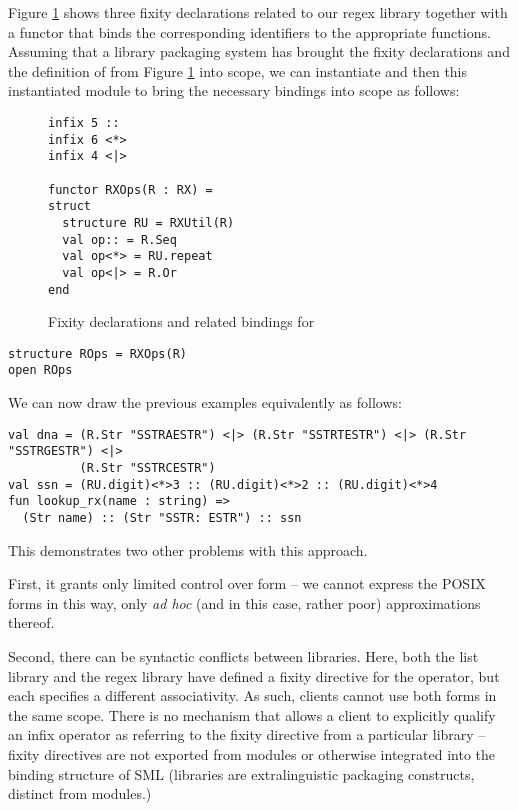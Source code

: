Figure \ref{fig:infix-RX} shows three fixity declarations related to our regex library together with a functor  that binds the corresponding identifiers to the appropriate functions. Assuming that a library packaging system has brought the fixity declarations and the definition of  from Figure \ref{fig:infix-RX} into scope, we can instantiate  and then  this instantiated module to bring the necessary bindings into scope as follows:


\begin{figure}
\begin{lstlisting}
infix 5 ::
infix 6 <*>
infix 4 <|>

functor RXOps(R : RX) =
struct 
  structure RU = RXUtil(R)
  val op:: = R.Seq
  val op<*> = RU.repeat
  val op<|> = R.Or
end
\end{lstlisting}
\caption{Fixity declarations and related bindings for }
\label{fig:infix-RX}
\vspace{-5px}
\end{figure}
\begin{lstlisting}[numbers=none]
structure ROps = RXOps(R)
open ROps
\end{lstlisting}
We can now draw the previous examples equivalently as follows:
\begin{lstlisting}[numbers=none]
val dna = (R.Str "SSTRAESTR") <|> (R.Str "SSTRTESTR") <|> (R.Str "SSTRGESTR") <|> 
          (R.Str "SSTRCESTR")
val ssn = (RU.digit)<*>3 :: (RU.digit)<*>2 :: (RU.digit)<*>4
fun lookup_rx(name : string) => 
  (Str name) :: (Str "SSTR: ESTR") :: ssn
\end{lstlisting}

This demonstrates two other problems with this approach. 

First, it grants only limited control over form -- we cannot express the POSIX forms in this way, only \emph{ad hoc} (and in this case, rather poor) approximations thereof. 

Second, there can be syntactic conflicts between libraries. Here, both the list library and the regex library have defined a fixity directive for the \li{::} operator, but each specifies a  different associativity. As such, clients cannot use both forms in the same scope. There is no mechanism that allows a client to explicitly qualify an infix operator as referring to the fixity directive from a particular library -- fixity directives are  not exported from modules or otherwise integrated into the binding structure of SML (libraries are extralinguistic packaging constructs, distinct from modules.) 

